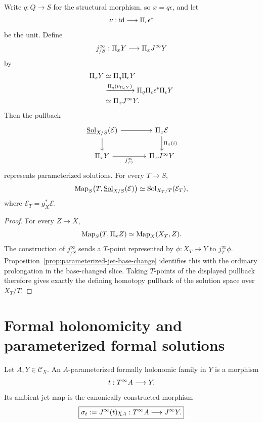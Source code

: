 \begin{theorem}
\label{thm:parameterized-solutions}
Write $q:Q\to S$ for the structural morphism, so $x=q\epsilon$, and let
\[
    \nu:\operatorname{id}\longrightarrow\Pi_\epsilon\epsilon^*
\]
be the unit.  Define
\[
    j^\infty_{/S}:\Pi_xY\longrightarrow\Pi_xJ^{\infty} Y
\]
by
\[
\begin{aligned}
\Pi_xY
&\simeq
\Pi_q\Pi_\epsilon Y\\
&\xrightarrow{\Pi_q(\nu_{\Pi_\epsilon Y})}
\Pi_q\Pi_\epsilon\epsilon^*\Pi_\epsilon Y\\
&\simeq
\Pi_xJ^{\infty} Y.
\end{aligned}
\]
Then the pullback
\[
\begin{tikzcd}[column sep=large]
\underline{\Sol}_{X/S}(\mathcal E)
  \arrow[r]
  \arrow[d]
& \Pi_x\mathcal E
  \arrow[d,"\Pi_x(i)"]
\\
\Pi_xY
  \arrow[r,"j^\infty_{/S}"']
& \Pi_x\Jinf Y
\end{tikzcd}
\]
represents parameterized solutions.  For every $T\to S$,
\[
    \operatorname{Map}_S\bigl(T,\underline{\operatorname{Sol}}_{X/S}(\mathcal E)\bigr)
    \simeq
    \operatorname{Sol}_{X_T/T}(\mathcal E_T),
\]
where $\mathcal E_T=g_X^*\mathcal E$.
\end{theorem}

\begin{proof}
For every $Z\to X$,
\[
    \operatorname{Map}_S(T,\Pi_xZ)\simeq\operatorname{Map}_X(X_T,Z).
\]
The construction of $j^\infty_{/S}$ sends a $T$-point represented by $\phi:X_T\to Y$ to $j_T^\infty\phi$.  Proposition~\ref{prop:parameterized-jet-base-change} identifies this with the ordinary prolongation in the base-changed slice.  Taking $T$-points of the displayed pullback therefore gives exactly the defining homotopy pullback of the solution space over $X_T/T$.
\end{proof}

\section{Formal holonomicity and parameterized formal solutions}
\label{sec:formal-solutions}

\begin{definition}
\label{def:formally-holonomic-family}
Let $A,Y\in\mathcal C_X$.  An $A$-parameterized formally holonomic family in $Y$ is a morphism
\[
    t:T^{\infty} A\longrightarrow Y.
\]
Its ambient jet map is the canonically constructed morphism
\[
    \boxed{
    \sigma_t:=J^{\infty}(t)\chi_A:
    T^{\infty} A\longrightarrow J^{\infty} Y.
    }
\]
\end{definition}


